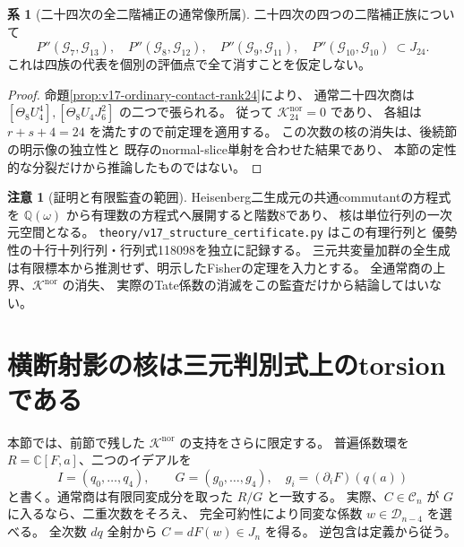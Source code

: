 \documentclass[a4paper,11pt]{ltjsarticle}
\theoremstyle{definition}
\newtheorem{remark}[theorem]{注意}
\newtheorem{corollary}[theorem]{系}
\begin{document}
\begin{corollary}[二十四次の全二階補正の通常像所属]
\label{cor:v17-twentyfourth-corrections-conditional}
二十四次の四つの二階補正族について
\[
 P''(\mathcal G_7,\mathcal G_{13}),\quad
 P''(\mathcal G_8,\mathcal G_{12}),\quad
 P''(\mathcal G_9,\mathcal G_{11}),\quad
 P''(\mathcal G_{10},\mathcal G_{10})
 \ \subset J_{24}.
\]
これは四族の代表を個別の評価点で全て消すことを仮定しない。
\end{corollary}

\begin{proof}
命題\ref{prop:v17-ordinary-contact-rank24}により、
通常二十四次商は $[\Theta_8U_4^4],[\Theta_8U_4J_6^2]$ の二つで張られる。
従って $\mathcal K_{24}^{\mathrm{nor}}=0$ であり、
各組は $r+s+4=24$ を満たすので前定理を適用する。
この次数の核の消失は、後続節の明示像の独立性と
既存のnormal-slice単射を合わせた結果であり、
本節の定性的な分裂だけから推論したものではない。
\end{proof}

\begin{remark}[証明と有限監査の範囲]
Heisenberg二生成元の共通commutantの方程式を
$\mathbb Q(\omega)$ から有理数の方程式へ展開すると階数8であり、
核は単位行列の一次元空間となる。
\nolinkurl{theory/v17_structure_certificate.py} はこの有理行列と
優勢性の十行十列行列・行列式118098を独立に記録する。
三元共変量加群の全生成は有限標本から推測せず、明示したFisherの定理を入力とする。
全通常商の上界、$\mathcal K^{\mathrm{nor}}$ の消失、
実際のTate係数の消滅をこの監査だけから結論してはいない。
\end{remark}




\section{横断射影の核は三元判別式上のtorsionである}
\label{sec:v17-discriminant-torsion}

本節では、前節で残した $\mathcal K^{\mathrm{nor}}$ の支持をさらに限定する。
普遍係数環を $R=\mathbb C[F,a]$、二つのイデアルを
\[
 I=(q_0,\ldots,q_4),\qquad G=(g_0,\ldots,g_4),\quad
 g_i=(\partial_iF)(q(a))
\]
と書く。通常商は有限同変成分を取った $R/G$ と一致する。
実際、$C\in\mathcal C_n$ が $G$ に入るなら、二重次数をそろえ、
完全可約性により同変な係数 $w\in\mathcal D_{n-4}$ を選べる。
全次数 $dq$ 全射から $C=dF(w)\in J_n$ を得る。
逆包含は定義から従う。
\end{document}
